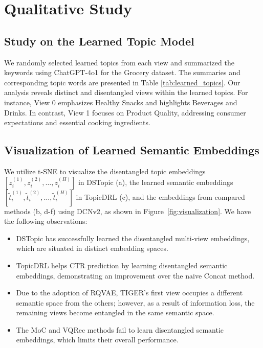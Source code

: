 
\section{Qualitative Study}


\subsection{Study on the Learned Topic Model}
We randomly selected learned topics from each view and summarized the keywords using ChatGPT-4o1 for the Grocery dataset. The summaries and corresponding topic words are presented in Table \ref{tab:learned_topics}. Our analysis reveals distinct and disentangled views within the learned topics. For instance, View 0 emphasizes Healthy Snacks and highlights Beverages and Drinks. In contrast, View 1 focuses on Product Quality, addressing consumer expectations and essential cooking ingredients.

\subsection{Visualization of Learned Semantic Embeddings}
We utilize t-SNE \cite{TSNE} to visualize the disentangled topic embeddings $[z^{(1)}_i, z^{(2)}_i, \dots, z^{(H)}_i]$ in DSTopic (a), the learned semantic embeddings $[\tilde{t}^{(1)}_i, \tilde{t}^{(2)}_i, \dots, \tilde{t}^{(H)}_i]$ in TopicDRL (c), and the embeddings from compared methods (b, d-f) using DCNv2, as shown in Figure~\ref{fig:visualization}. We have the following observations:
\begin{itemize}
    \item DSTopic has successfully learned the disentangled multi-view embeddings, which are situated in distinct embedding spaces.
    \item TopicDRL helps CTR prediction by learning disentangled semantic embeddings, demonstrating an improvement over the naive Concat method.
    \item Due to the adoption of RQVAE, TIGER’s first view occupies a different semantic space from the others; however, as a result of information loss, the remaining views become entangled in the same semantic space.
    \item The MoC and VQRec methods fail to learn disentangled semantic embeddings, which limits their overall performance.
\end{itemize}
